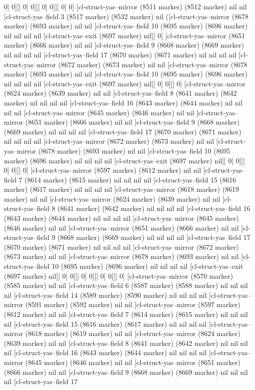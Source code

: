 {{0] 0]]] 0] 0]]] 0] 0]]] 0] 0] [cl-struct-yas--mirror (8511 marker) (8512 marker) nil nil [cl-struct-yas--field 3 (8517 marker) (8532 marker) nil ([cl-struct-yas--mirror (8678 marker) (8693 marker) nil nil [cl-struct-yas--field 10 (8695 marker) (8696 marker) nil nil nil nil [cl-struct-yas--exit (8697 marker) nil]] 0] [cl-struct-yas--mirror (8651 marker) (8666 marker) nil nil [cl-struct-yas--field 9 (8668 marker) (8669 marker) nil nil nil nil [cl-struct-yas--field 17 (8670 marker) (8671 marker) nil nil nil nil [cl-struct-yas--mirror (8672 marker) (8673 marker) nil nil [cl-struct-yas--mirror (8678 marker) (8693 marker) nil nil [cl-struct-yas--field 10 (8695 marker) (8696 marker) nil nil nil nil [cl-struct-yas--exit (8697 marker) nil]] 0] 0]]] 0] [cl-struct-yas--mirror (8624 marker) (8639 marker) nil nil [cl-struct-yas--field 8 (8641 marker) (8642 marker) nil nil nil nil [cl-struct-yas--field 16 (8643 marker) (8644 marker) nil nil nil nil [cl-struct-yas--mirror (8645 marker) (8646 marker) nil nil [cl-struct-yas--mirror (8651 marker) (8666 marker) nil nil [cl-struct-yas--field 9 (8668 marker) (8669 marker) nil nil nil nil [cl-struct-yas--field 17 (8670 marker) (8671 marker) nil nil nil nil [cl-struct-yas--mirror (8672 marker) (8673 marker) nil nil [cl-struct-yas--mirror (8678 marker) (8693 marker) nil nil [cl-struct-yas--field 10 (8695 marker) (8696 marker) nil nil nil nil [cl-struct-yas--exit (8697 marker) nil]] 0] 0]]] 0] 0]]] 0] [cl-struct-yas--mirror (8597 marker) (8612 marker) nil nil [cl-struct-yas--field 7 (8614 marker) (8615 marker) nil nil nil nil [cl-struct-yas--field 15 (8616 marker) (8617 marker) nil nil nil nil [cl-struct-yas--mirror (8618 marker) (8619 marker) nil nil [cl-struct-yas--mirror (8624 marker) (8639 marker) nil nil [cl-struct-yas--field 8 (8641 marker) (8642 marker) nil nil nil nil [cl-struct-yas--field 16 (8643 marker) (8644 marker) nil nil nil nil [cl-struct-yas--mirror (8645 marker) (8646 marker) nil nil [cl-struct-yas--mirror (8651 marker) (8666 marker) nil nil [cl-struct-yas--field 9 (8668 marker) (8669 marker) nil nil nil nil [cl-struct-yas--field 17 (8670 marker) (8671 marker) nil nil nil nil [cl-struct-yas--mirror (8672 marker) (8673 marker) nil nil [cl-struct-yas--mirror (8678 marker) (8693 marker) nil nil [cl-struct-yas--field 10 (8695 marker) (8696 marker) nil nil nil nil [cl-struct-yas--exit (8697 marker) nil]] 0] 0]]] 0] 0]]] 0] 0]]] 0] [cl-struct-yas--mirror (8570 marker) (8585 marker) nil nil [cl-struct-yas--field 6 (8587 marker) (8588 marker) nil nil nil nil [cl-struct-yas--field 14 (8589 marker) (8590 marker) nil nil nil nil [cl-struct-yas--mirror (8591 marker) (8592 marker) nil nil [cl-struct-yas--mirror (8597 marker) (8612 marker) nil nil [cl-struct-yas--field 7 (8614 marker) (8615 marker) nil nil nil nil [cl-struct-yas--field 15 (8616 marker) (8617 marker) nil nil nil nil [cl-struct-yas--mirror (8618 marker) (8619 marker) nil nil [cl-struct-yas--mirror (8624 marker) (8639 marker) nil nil [cl-struct-yas--field 8 (8641 marker) (8642 marker) nil nil nil nil [cl-struct-yas--field 16 (8643 marker) (8644 marker) nil nil nil nil [cl-struct-yas--mirror (8645 marker) (8646 marker) nil nil [cl-struct-yas--mirror (8651 marker) (8666 marker) nil nil [cl-struct-yas--field 9 (8668 marker) (8669 marker) nil nil nil nil [cl-struct-yas--field 17 }}
